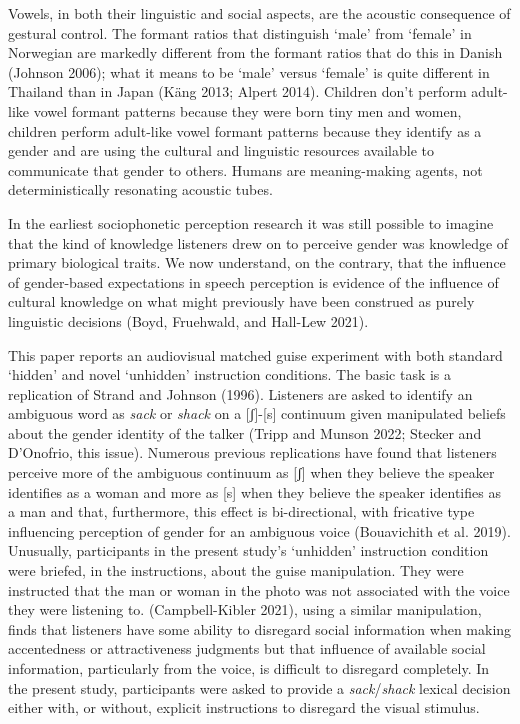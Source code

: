 \documentclass[
  letterpaper,
  DIV=11,
  numbers=noendperiod]{scrartcl}
\begin{document}
Vowels, in both their linguistic and social aspects, are the acoustic
consequence of gestural control. The formant ratios that distinguish
`male' from `female' in Norwegian are markedly different from the
formant ratios that do this in Danish (Johnson 2006); what it means to
be `male' versus `female' is quite different in Thailand than in Japan
(Käng 2013; Alpert 2014). Children don't perform adult-like vowel
formant patterns because they were born tiny men and women, children
perform adult-like vowel formant patterns because they identify as a
gender and are using the cultural and linguistic resources available to
communicate that gender to others. Humans are meaning-making agents, not
deterministically resonating acoustic tubes.

In the earliest sociophonetic perception research it was still possible
to imagine that the kind of knowledge listeners drew on to perceive
gender was knowledge of primary biological traits. We now understand, on
the contrary, that the influence of gender-based expectations in speech
perception is evidence of the influence of cultural knowledge on what
might previously have been construed as purely linguistic decisions
(Boyd, Fruehwald, and Hall-Lew 2021).

This paper reports an audiovisual matched guise experiment with both
standard `hidden' and novel `unhidden' instruction conditions. The basic
task is a replication of Strand and Johnson (1996). Listeners are asked
to identify an ambiguous word as \emph{sack} or \emph{shack} on a
{[}ʃ{]}-{[}s{]} continuum given manipulated beliefs about the gender
identity of the talker (Tripp and Munson 2022; Stecker and D'Onofrio,
this issue). Numerous previous replications have found that listeners
perceive more of the ambiguous continuum as {[}ʃ{]} when they believe
the speaker identifies as a woman and more as {[}s{]} when they believe
the speaker identifies as a man and that, furthermore, this effect is
bi-directional, with fricative type influencing perception of gender for
an ambiguous voice (Bouavichith et al. 2019). Unusually, participants in
the present study's `unhidden' instruction condition were briefed, in
the instructions, about the guise manipulation. They were instructed
that the man or woman in the photo was not associated with the voice
they were listening to. (Campbell-Kibler 2021), using a similar
manipulation, finds that listeners have some ability to disregard social
information when making accentedness or attractiveness judgments but
that influence of available social information, particularly from the
voice, is difficult to disregard completely. In the present study,
participants were asked to provide a \emph{sack}/\emph{shack} lexical
decision either with, or without, explicit instructions to disregard the
visual stimulus.
\end{document}
